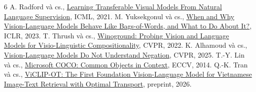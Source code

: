 \documentclass[11pt,a4paper]{article}
\begin{document}
\begingroup\small\begin{thebibliography}{6}
 A. Radford và cs., \href{https://proceedings.mlr.press/v139/radford21a.html}{Learning Transferable Visual Models From Natural Language Supervision}, ICML, 2021.
 M. Yuksekgonul và cs., \href{https://arxiv.org/abs/2210.01936}{When and Why Vision-Language Models Behave Like Bags-of-Words, and What to Do About It?}, ICLR, 2023.
 T. Thrush và cs., \href{https://arxiv.org/abs/2204.03162}{Winoground: Probing Vision and Language Models for Visio-Linguistic Compositionality}, CVPR, 2022.
 K. Alhamoud và cs., \href{https://arxiv.org/abs/2501.09425}{Vision-Language Models Do Not Understand Negation}, CVPR, 2025.
 T.-Y. Lin và cs., \href{https://arxiv.org/abs/1405.0312}{Microsoft COCO: Common Objects in Context}, ECCV, 2014.
 Q.-K. Tran và cs., \href{https://arxiv.org/abs/2602.22678}{ViCLIP-OT: The First Foundation Vision-Language Model for Vietnamese Image-Text Retrieval with Optimal Transport}, preprint, 2026.
\end{thebibliography}\endgroup
\end{document}
